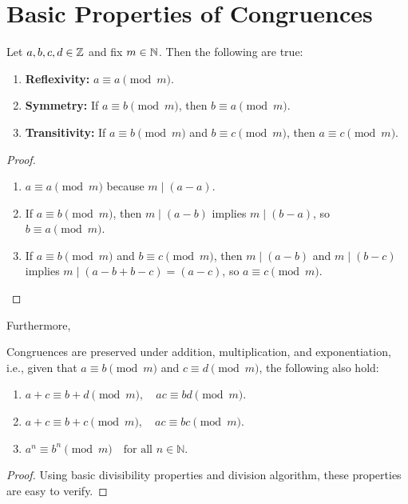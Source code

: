 \section{Basic Properties of Congruences}
\begin{prop}
    Let $a, b, c, d \in \mathbb{Z}$ and fix $m \in \mathbb{N}$. Then the following are true:
    \begin{enumerate}
        \item \textbf{Reflexivity:} $a \equiv a \pmod{m}$.
        \item \textbf{Symmetry:} If $a \equiv b \pmod{m}$, then $b \equiv a \pmod{m}$.
        \item \textbf{Transitivity:} If $a \equiv b \pmod{m}$ and $b \equiv c \pmod{m}$, then $a \equiv c \pmod{m}$.
    \end{enumerate}
\end{prop}
\begin{proof}
    \begin{enumerate}
        \item $a \equiv a \pmod{m}$ because $m \mid (a-a)$.
        \item If $a \equiv b \pmod{m}$, then $m \mid (a-b)$ implies $m \mid (b-a)$, so $b \equiv a \pmod{m}$.
        \item If $a \equiv b \pmod{m}$ and $b \equiv c \pmod{m}$, then $m \mid (a-b)$ and $m \mid (b-c)$ implies $m \mid (a - b + b - c) = (a-c)$, so $a \equiv c \pmod{m}$.
    \end{enumerate}
\end{proof}
Furthermore,
\begin{prop}\label{prop:cong}
    Congruences are preserved under addition, multiplication, and exponentiation, i.e., given that \( a \equiv b \pmod{m} \) and \( c \equiv d \pmod{m} \), the following also hold:  
    \begin{enumerate}  
        \item $ a + c \equiv b + d \pmod{m}, \quad ac \equiv bd \pmod{m}. $  
        \item $ a + c \equiv b + c \pmod{m}, \quad ac \equiv bc \pmod{m}. $  
        \item $ a^n \equiv b^n \pmod{m} \quad \text{for all } n \in \mathbb{N}. $  
    \end{enumerate}  
\end{prop}
\begin{proof}
    Using basic divisibility properties and division algorithm, these properties are easy to verify.
\end{proof}

